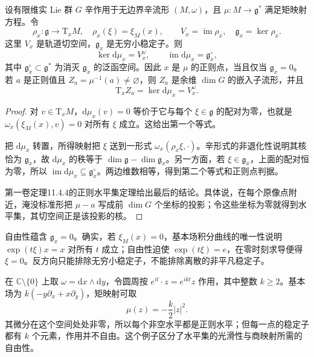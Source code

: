 \begin{proposition}\label{g4:prop:1002:moment-differential}
	设有限维实 Lie 群 \(G\) 辛作用于无边界辛流形 \((M,\omega)\)，且 \(\mu:M\to\mathfrak g^*\) 满足矩映射方程。令
	\[
		\rho_x:\mathfrak g\longrightarrow\mathrm{T}_xM,
		\quad \rho_x(\xi)=\xi_M(x),
		\qquad V_x=\operatorname{im}\rho_x,
		\quad\mathfrak g_x=\ker\rho_x.
	\]
	这里 \(V_x\) 是轨道切空间，\(\mathfrak g_x\) 是无穷小稳定子。则
	\begin{equation}\label{g4:eq:1002:moment-kernel-image}
		\ker\mathrm{d}\mu_x=V_x^\omega,
		\qquad
		\operatorname{im}\mathrm{d}\mu_x=\mathfrak g_x^\circ,
	\end{equation}
	其中 \(\mathfrak g_x^\circ\subset\mathfrak g^*\) 为消灭 \(\mathfrak g_x\) 的泛函空间。因此 \(x\) 是 \(\mu\) 的正则点，当且仅当 \(\mathfrak g_x=0\)。若 \(a\) 是正则值且 \(Z_a=\mu^{-1}(a)\ne\varnothing\)，则 \(Z_a\) 是余维 \(\dim G\) 的嵌入子流形，并且
	\begin{equation}\label{g4:eq:1002:level-tangent}
		\mathrm{T}_xZ_a=\ker\mathrm{d}\mu_x=V_x^\omega.
	\end{equation}
\end{proposition}
\begin{proof}
	对 \(v\in\mathrm{T}_xM\)，\(\mathrm{d}\mu_x(v)=0\) 等价于它与每个 \(\xi\in\mathfrak g\) 的配对为零，也就是 \(\omega_x(\xi_M(x),v)=0\) 对所有 \(\xi\) 成立。这给出第一个等式。

	把 \(\mathrm{d}\mu_x\) 转置，所得映射把 \(\xi\) 送到一形式 \(\omega_x(\rho_x\xi,\cdot)\)。辛形式的非退化性说明其核恰为 \(\mathfrak g_x\)，故 \(\mathrm{d}\mu_x\) 的秩等于 \(\dim\mathfrak g-\dim\mathfrak g_x\)。另一方面，若 \(\xi\in\mathfrak g_x\)，上面的配对恒为零，所以 \(\operatorname{im}\mathrm{d}\mu_x\subseteq\mathfrak g_x^\circ\)。两边维数相等，得到第二个等式和正则点判据。

	第一卷定理11.4.4的正则水平集定理给出最后的结论。具体说，在每个原像点附近，淹没标准形把 \(\mu-a\) 写成前 \(\dim G\) 个坐标的投影；令这些坐标为零就得到水平集，其切空间正是该投影的核。
\end{proof}

自由性蕴含 \(\mathfrak g_x=0\)。确实，若 \(\xi_M(x)=0\)，基本场积分曲线的唯一性说明 \(\exp(t\xi)x=x\) 对所有 \(t\) 成立；自由性迫使 \(\exp(t\xi)=e\)，在零时刻求导便得 \(\xi=0\)。反方向只能排除无穷小稳定子，不能排除离散的非平凡稳定子。

\begin{example}\label{g4:exm:1002:regular-not-free}
	在 \(\mathbb C\setminus\{0\}\) 上取 \(\omega=\mathrm{d}x\wedge\mathrm{d}y\)，令圆周按 \(e^{it}\cdot z=e^{ikt}z\) 作用，其中整数 \(k\ge2\)。基本场为 \(k(-y\partial_x+x\partial_y)\)，矩映射可取
	\[
		\mu(z)=-\frac{k}{2}|z|^2.
	\]
	其微分在这个空间处处非零，所以每个非空水平都是正则水平；但每一点的稳定子都有 \(k\) 个元素，作用并不自由。这个例子区分了水平集的光滑性与商映射所需的自由性。
\end{example}

